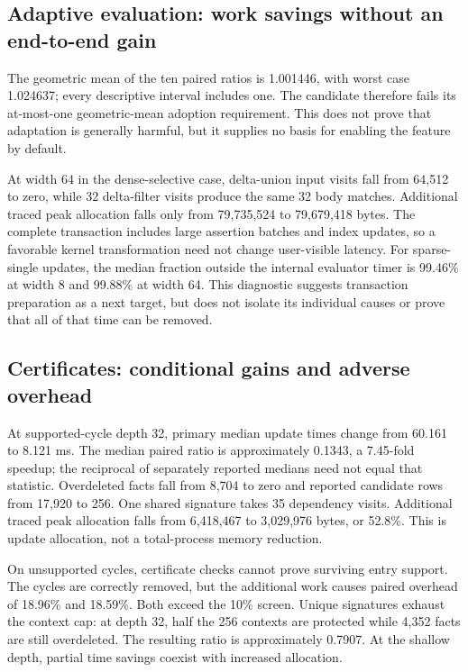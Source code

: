 \documentclass{article}
\begin{document}
\subsection{Adaptive evaluation: work savings without an end-to-end gain}

The geometric mean of the ten paired ratios is 1.001446, with worst case
1.024637; every descriptive interval includes one. The candidate therefore
fails its at-most-one geometric-mean adoption requirement. This does not prove
that adaptation is generally harmful, but it supplies no basis for enabling
the feature by default.

At width 64 in the dense-selective case, delta-union input visits fall from
64,512 to zero, while 32 delta-filter visits produce the same 32 body matches.
Additional traced peak allocation falls only from 79,735,524 to 79,679,418
bytes. The complete transaction includes large assertion batches and index
updates, so a favorable kernel transformation need not change user-visible
latency. For sparse-single updates, the median fraction outside the internal
evaluator timer is 99.46\% at width 8 and 99.88\% at width 64. This diagnostic
suggests transaction preparation as a next target, but does not isolate its
individual causes or prove that all of that time can be removed.

\subsection{Certificates: conditional gains and adverse overhead}

At supported-cycle depth 32, primary median update times change from 60.161 to
8.121 ms. The median paired ratio is approximately 0.1343, a 7.45-fold speedup;
the reciprocal of separately reported medians need not equal that statistic.
Overdeleted facts fall from 8,704 to zero and reported candidate rows from
17,920 to 256. One shared signature takes 35 dependency visits. Additional
traced peak allocation falls from 6,418,467 to 3,029,976 bytes, or 52.8\%.
This is update allocation, not a total-process memory reduction.

On unsupported cycles, certificate checks cannot prove surviving entry support.
The cycles are correctly removed, but the additional work causes paired
overhead of 18.96\% and 18.59\%. Both exceed the 10\% screen. Unique signatures
exhaust the context cap: at depth 32, half the 256 contexts are protected while
4,352 facts are still overdeleted. The resulting ratio is approximately 0.7907.
At the shallow depth, partial time savings coexist with increased allocation.
\end{document}
